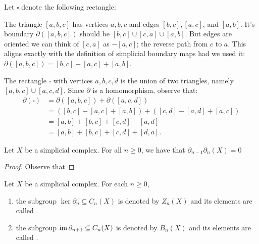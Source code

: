    \begin{example}\label{example:square-boundaries}
        Let $\square$ denote the following rectangle:
            \begin{center}
            \end{center}
        The triangle $[a,b,c]$ has vertices $a,b,c$ and edges $[b,c], [a,c]$, and $[a,b]$. It's boundary $\partial([a,b,c])$ should be $[b,c] \cup [c,a] \cup [a,b]$. But edges are oriented \textemdash we can think of $[c,a]$ as $-[a,c]$; the reverse path from $c$ to $a$. This aligns exactly with the definition of simplicial boundary maps had we used it: $\partial([a,b,c])
        = [b,c] - [a,c] + [a,b]$.

        The rectangle $\square$ with vertices $a,b,c,d$ is the union of two triangles, namely $[a,b,c] \cup [a,c,d]$. Since $\partial$ is a homomorphism, observe that:
            \begin{equation*}
            \begin{split}
                \partial(\square)
                & = \partial([a,b,c]) + \partial([a,c,d]) \\
                & = ([b,c]-[a,c]+[a,b]) + ([c,d]-[a,d]+[a,c]) \\
                & = [a,b]+[b,c]+[c,d]-[a,d] \\
                & = [a,b]+[b,c]+[c,d]+[d,a].
            \end{split}
            \end{equation*}
    \end{example}

    \begin{proposition}\label{prop:boundaries-cancel}
        Let $X$ be a simplicial complex. For all $n \geq 0$, we have that  $ \partial_{n-1} \partial_{n}(X) = 0$
    \end{proposition}
        \begin{proof}
            Observe that
        \end{proof}

    \begin{definition}\label{def:cycles-boundaries}
        Let $X$ be a simplicial complex. For each $n \geq 0$,
        \begin{enumerate}[label = (\arabic*)]
            \item the subgroup $\ker{\partial_n} \subseteq C_n(X)$ is denoted by $Z_n(X)$ and its elements are called .
            \item the subgroup $\operatorname{im}{\partial_{n+1}} \subseteq C_n(X)$ is denoted by $B_n(X)$ and its elements are called \newline {}.
        \end{enumerate}
    \end{definition}

